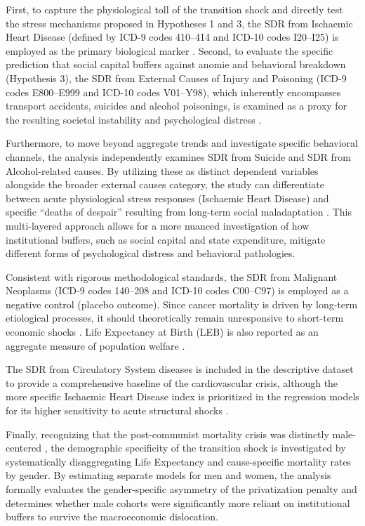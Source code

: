 \documentclass[12pt]{article}
\begin{document}
First, to capture the physiological toll of the transition shock and directly test the stress mechanisms proposed in Hypotheses 1 and 3, the SDR from 
Ischaemic Heart Disease (defined by ICD-9 codes 410--414 and ICD-10 codes I20--I25) is employed as the primary biological marker \citep{Cornia2016, Leon1998}. 
Second, to evaluate the specific prediction that social capital buffers against anomie and behavioral breakdown (Hypothesis 3), the SDR from External Causes 
of Injury and Poisoning (ICD-9 codes E800--E999 and ICD-10 codes V01--Y98), which inherently encompasses transport accidents, suicides and alcohol poisonings, is 
examined as a proxy for the resulting societal instability and psychological distress \citep{Stuckler2009, Brainerd2001}.

Furthermore, to move beyond aggregate trends and investigate specific behavioral channels, the analysis independently examines SDR from 
Suicide and SDR from Alcohol-related causes. By utilizing these as distinct dependent variables alongside the broader external causes category, 
the study can differentiate between acute physiological stress responses (Ischaemic Heart Disease) and specific ``deaths of despair'' resulting from 
long-term social maladaptation \citep{King2009, Brainerd2001, Zaridze2009}. This multi-layered approach allows for a more nuanced investigation of how 
institutional buffers, such as social capital and state expenditure, mitigate different forms of psychological distress and behavioral pathologies.

Consistent with rigorous methodological standards, the SDR from Malignant Neoplasms (ICD-9 codes 140--208 and ICD-10 codes 
C00--C97) is employed as a negative control (placebo outcome). Since cancer mortality is driven by long-term etiological processes, 
it should theoretically remain unresponsive to short-term economic shocks \citep{Leon1997, Brainerd2005}. Life Expectancy at Birth (LEB) is also 
reported as an aggregate measure of population welfare \citep{Cornia2016, B_Brainerd1998}.

The SDR from Circulatory System diseases is included in the descriptive dataset to provide a comprehensive baseline of the 
cardiovascular crisis, although the more specific Ischaemic Heart Disease index is prioritized in the regression models for its higher 
sensitivity to acute structural shocks \citep{Cornia2016, Zaridze2009}.

Finally, recognizing that the post-communist mortality crisis was distinctly male-centered \citep{Leon1998, B_Brainerd1998}, the demographic 
specificity of the transition shock is investigated by systematically disaggregating Life Expectancy and cause-specific mortality rates by gender. 
By estimating separate models for men and women, the analysis formally evaluates the gender-specific asymmetry of the privatization penalty and 
determines whether male cohorts were significantly more reliant on institutional buffers to survive the macroeconomic dislocation.
\end{document}
